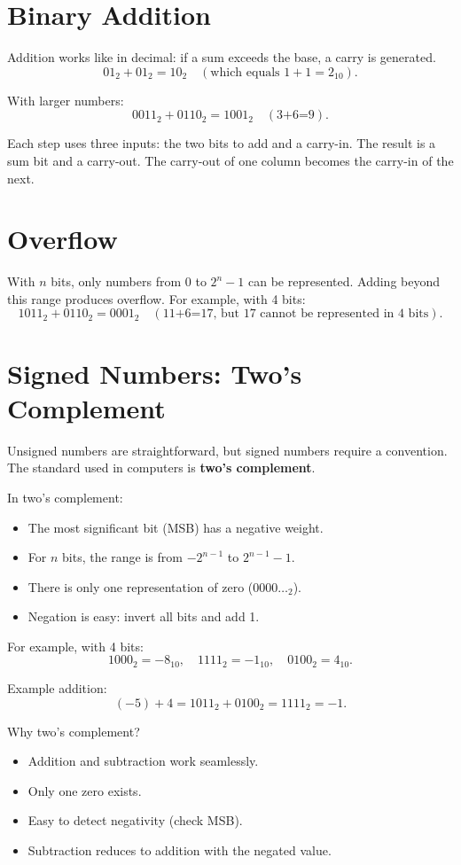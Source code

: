 \documentclass[11pt]{article}
\begin{document}
\section*{Binary Addition}
Addition works like in decimal: if a sum exceeds the base, a carry is generated.
\[
  01_2 + 01_2 = 10_2 \quad (\text{which equals } 1+1=2_{10}).
\]

With larger numbers:
\[
  0011_2 + 0110_2 = 1001_2 \quad (\text{3+6=9}).
\]

Each step uses three inputs: the two bits to add and a carry-in. The result is a sum bit and a carry-out. The carry-out of one column becomes the carry-in of the next.

\section*{Overflow}
With $n$ bits, only numbers from $0$ to $2^n - 1$ can be represented. Adding beyond this range produces overflow. For example, with 4 bits:
\[
  1011_2 + 0110_2 = 0001_2 \quad (\text{11+6=17, but 17 cannot be represented in 4 bits}).
\]

\section*{Signed Numbers: Two’s Complement}
Unsigned numbers are straightforward, but signed numbers require a convention. The standard used in computers is \textbf{two’s complement}. 

In two’s complement:
\begin{itemize}
  \item The most significant bit (MSB) has a negative weight.
  \item For $n$ bits, the range is from $-2^{n-1}$ to $2^{n-1}-1$.
  \item There is only one representation of zero ($0000\ldots_2$).
  \item Negation is easy: invert all bits and add 1.
\end{itemize}

For example, with 4 bits:
\[
  1000_2 = -8_{10}, \quad 1111_2 = -1_{10}, \quad 0100_2 = 4_{10}.
\]

Example addition:
\[
  (-5) + 4 = 1011_2 + 0100_2 = 1111_2 = -1.
\]

Why two’s complement?
\begin{itemize}
  \item Addition and subtraction work seamlessly.
  \item Only one zero exists.
  \item Easy to detect negativity (check MSB).
  \item Subtraction reduces to addition with the negated value.
\end{itemize}
\end{document}
